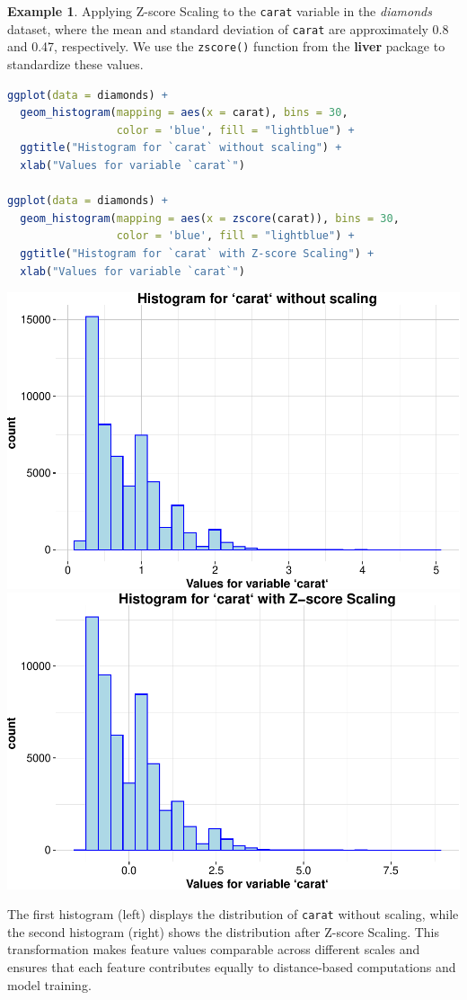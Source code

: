 \documentclass[
]{book}
\newcommand{\passthrough}[1]{#1}
\theoremstyle{definition}
\theoremstyle{definition}
\newtheorem{example}{Example}[chapter]
\theoremstyle{definition}
\theoremstyle{definition}
\theoremstyle{remark}
\begin{document}
\begin{example}
\protect\hypertarget{exm:ex-zscore}{}\label{exm:ex-zscore}Applying Z-score Scaling to the \passthrough{\lstinline!carat!} variable in the \emph{diamonds} dataset, where the mean and standard deviation of \passthrough{\lstinline!carat!} are approximately 0.8 and 0.47, respectively. We use the \passthrough{\lstinline!zscore()!} function from the \textbf{liver} package to standardize these values.

\begin{lstlisting}[language=R]
ggplot(data = diamonds) +
  geom_histogram(mapping = aes(x = carat), bins = 30,
                 color = 'blue', fill = "lightblue") +
  ggtitle("Histogram for `carat` without scaling") + 
  xlab("Values for variable `carat`")

ggplot(data = diamonds) +
  geom_histogram(mapping = aes(x = zscore(carat)), bins = 30,
                 color = 'blue', fill = "lightblue") +
  ggtitle("Histogram for `carat` with Z-score Scaling") + 
  xlab("Values for variable `carat`")
\end{lstlisting}

\includegraphics[width=0.5\linewidth]{data-preparation_files/figure-latex/unnamed-chunk-12-1} \includegraphics[width=0.5\linewidth]{data-preparation_files/figure-latex/unnamed-chunk-12-2}

The first histogram (left) displays the distribution of \passthrough{\lstinline!carat!} without scaling, while the second histogram (right) shows the distribution after Z-score Scaling. This transformation makes feature values comparable across different scales and ensures that each feature contributes equally to distance-based computations and model training.
\end{example}
\end{document}

